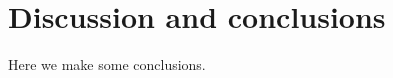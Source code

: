 \section{Discussion and conclusions}
\protect\label{section:discussion}

Here we make some conclusions.
